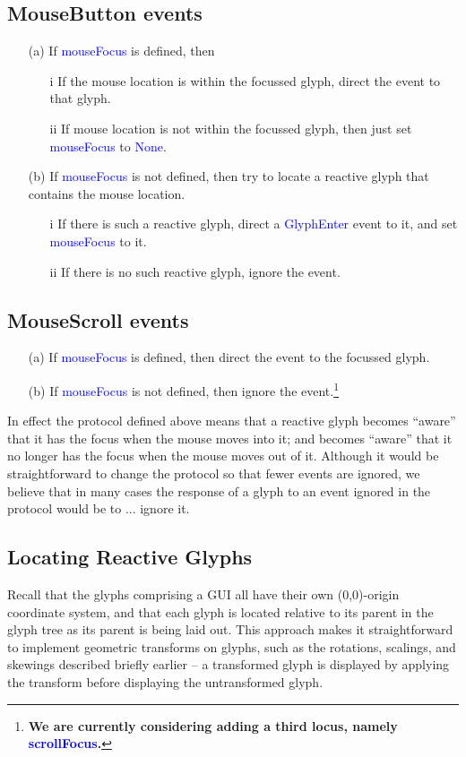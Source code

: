 \documentclass[12pt,a4paper]{article}
\def\Scala#1{\textcolor{blue}{\textsf{#1}}}
\def\SS#1{\subsection{#1}}
\begin{document}
  
\SS{MouseButton events}
\begin{itemize}
    \item[(a)] If \Scala{mouseFocus} is defined, then
    \begin{itemize}
        \item[i] If the mouse location is within the focussed glyph, direct the
        event to that glyph.
        \item[ii] If mouse location is not within the focussed glyph, then
        just set \Scala{mouseFocus} to \Scala{None}.
    \end{itemize}
    \item[(b)] If \Scala{mouseFocus} is not defined, then try to locate a reactive glyph
               that contains the mouse location.
              \begin{itemize}
                  \item[i] If there is such a reactive glyph, direct a \Scala{GlyphEnter}
                        event to it, and set \Scala{mouseFocus} to it.
                  \item[ii] If there is no such reactive glyph, ignore the event.
              \end{itemize}
  \end{itemize}


\SS{MouseScroll events}
\begin{itemize}
    \item[(a)] If \Scala{mouseFocus} is defined, then direct the event to the focussed glyph.
    \item[(b)] If \Scala{mouseFocus} is not defined, then ignore the
               event.\footnote{\textbf{We are currently considering
               adding a third locus, namely \Scala{scrollFocus}.}}
\end{itemize}


 


In effect the protocol defined above means that a reactive glyph becomes ``aware'' that it has the focus
when the mouse moves into it; and becomes ``aware'' that it no longer has the focus
when the mouse moves out of it. Although it would be straightforward to change the
protocol so that fewer events are ignored, we believe that in many cases the
response of a glyph to an event ignored in the protocol would be to ... ignore it.


\SS{Locating Reactive Glyphs}\label{locatingreactiveglyphs}
Recall that the glyphs comprising a GUI all have their own
(0,0)-origin coordinate system, and that each glyph is located
relative to its parent in the glyph tree as its parent is being
laid out. This approach makes it straightforward to implement
geometric transforms on glyphs, such as the rotations, scalings, and
skewings described briefly earlier -- a transformed glyph is
displayed by applying the transform before displaying
the untransformed glyph. 
\end{document}
